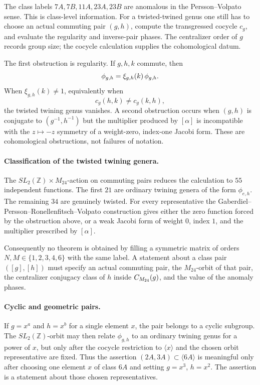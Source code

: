 The class labels \(7A,7B,11A,23A,23B\) are anomalous in the
Persson--Volpato sense.  This is class-level information.  For a
twisted-twined genus one still has to choose an actual commuting pair
\((g,h)\), compute the transgressed cocycle \(c_g\), and evaluate the
regularity and inverse-pair phases.  The centralizer order of \(g\)
records group size; the cocycle calculation supplies the cohomological datum.

The first obstruction is regularity.  If \(g,h,k\) commute, then
\[
  \phi_{g,h}=\xi_{g,h}(k)\,\phi_{g,h} .
\]
When \(\xi_{g,h}(k)\ne 1\), equivalently when
\[
  c_g(h,k)\ne c_g(k,h),
\]
the twisted twining genus vanishes.  A second obstruction occurs when
\((g,h)\) is conjugate to \((g^{-1},h^{-1})\) but the multiplier produced by
\([\alpha]\) is incompatible with the \(z\mapsto -z\) symmetry of a
weight-zero, index-one Jacobi form.  These are cohomological
obstructions, not failures of notation.

\paragraph{Classification of the twisted twining genera.}
The \(SL_2(\mathbb Z)\times M_{24}\)-action on commuting pairs reduces
the calculation to \(55\) independent functions.  The first \(21\) are
ordinary twining genera of the form \(\phi_{e,h}\).  The remaining
\(34\) are genuinely twisted.  For every representative the
Gaberdiel--Persson--Ronellenfitsch--Volpato construction gives either
the zero function forced by the obstruction above, or a weak Jacobi
form of weight \(0\), index \(1\), and the multiplier prescribed by
\([\alpha]\).

Consequently no theorem is obtained by filling a symmetric matrix of
orders \(N,M\in\{1,2,3,4,6\}\) with the same label.  A statement about
a class pair \(([g],[h])\) must specify an actual commuting pair, the
\(M_{24}\)-orbit of that pair, the centralizer conjugacy class of
\(h\) inside \(C_{M_{24}}(g)\), and the value of the anomaly phases.

\paragraph{Cyclic and geometric pairs.}
If \(g=x^a\) and \(h=x^b\) for a single element \(x\), the pair belongs
to a cyclic subgroup.  The \(SL_2(\mathbb Z)\)-orbit may then relate
\(\phi_{g,h}\) to an ordinary twining genus for a power of \(x\), but
only after the cocycle restriction to \(\langle x\rangle\) and the
chosen orbit representative are fixed.  Thus the assertion
\((2A,3A)\subset\langle6A\rangle\) is meaningful only after choosing
one element \(x\) of class \(6A\) and setting \(g=x^3\), \(h=x^2\).
The assertion is a statement about those chosen representatives.

